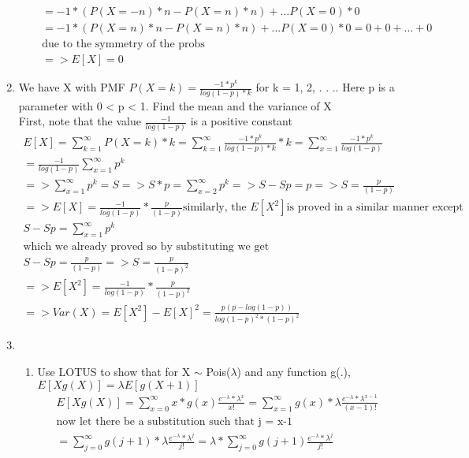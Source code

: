 \documentclass[11pt]{article}
\begin{document}
\begin{enumerate}
\begin{enumerate}
\begin{gather}
		= -1*(P(X=-n)*n - P(X=n)*n) + ... P(X=0)*0 \\
		=  -1*(P(X=n)*n - P(X=n)*n) + ... P(X=0)*0 = 0+0+...+0 \\
		\text{due to the symmetry of the probs}\\
		=> E[X] = 0
	\end{gather}
\end{enumerate}
\item We have X with PMF $P(X = k) = \frac{-1*p^k}{log(1-p)*k}$
for k = 1, 2, . . .. Here p is a parameter with 0 < p < 1. Find the mean and the variance of X
\\
First, note that the value $\frac{-1}{log(1-p)}$ is a positive constant
\begin{gather}
	E[X] = \sum_{k=1}^{\infty} P(X=k)*k = \sum_{k=1}^{\infty} \frac{-1*p^k}{log(1-p)*k} * k = \sum_{x=1}^{\infty} \frac{-1*p^k}{log(1-p)} \\ 
	= \frac{-1}{log(1-p)} \sum_{x=1}^{\infty} p^k \\
	=> \sum_{x=1}^{\infty} p^k = S => S*p = \sum_{x=2}^{\infty} p^k => S-Sp = p => S= \frac{p}{(1-p)}\\
	=> E[X] = \frac{-1}{log(1-p)} * \frac{p}{(1-p)}
	\text{similarly, the }E[X^2] \text{is proved in a similar manner except} \\
	S-Sp = \sum_{x=1}^{\infty} p^k \\
	\text{which we already proved so by substituting we get}\\
	S-Sp =  \frac{p}{(1-p)} => S = \frac{p}{(1-p)^2}\\
	=> E[X^2] = \frac{-1}{log(1-p)} * \frac{p}{(1-p)^2}\\
	=>Var(X) = E[X^2]-E[X]^2 = \frac{p(p-log(1-p))}{log(1-p)^2*(1-p)^2}
\end{gather}	
\item
\begin{enumerate}
	\item  Use LOTUS to show that for X $\sim$ Pois($\lambda$) and any function g(.), $E[Xg(X)] = \lambda E[g(X+1)]$
	\begin{gather}
		E[Xg(X)] = \sum_{x=0}^{\infty} x*g(x) \frac{e^{-\lambda} * \lambda ^ x}{x!} = \sum_{x=1}^{\infty} g(x)*\lambda \frac{e^{-\lambda} * \lambda ^{x-1}}{(x-1)!} \\
		\text{now let there be a substitution such that j = x-1}\\
		= \sum_{j=0}^{\infty} g(j+1)*\lambda \frac{e^{-\lambda} * \lambda ^{j}}{j!} =  \lambda * \sum_{j=0}^{\infty} g(j+1) \frac{e^{-\lambda} * \lambda ^{j}}{j!} \\

\end{gather}
\end{enumerate}
\end{enumerate}
\end{document}
